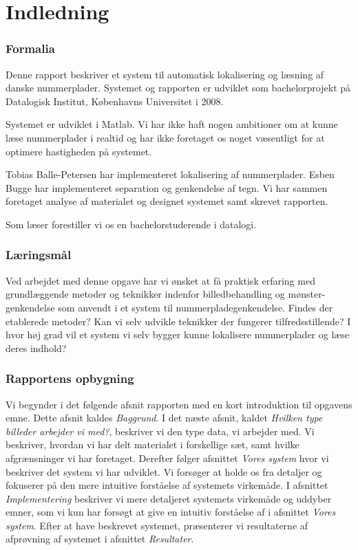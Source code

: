 \section{Indledning}

\subsubsection*{Formalia}
Denne rapport beskriver et system til automatisk lokalisering og læsning af danske nummerplader. Systemet og rapporten er udviklet som bachelorprojekt på Datalogisk Institut, Københavns Universitet i 2008.

Systemet er udviklet i Matlab. Vi har ikke haft nogen ambitioner om at kunne læse nummerplader i realtid og har ikke foretaget os noget væsentligt for at optimere hastigheden på systemet.

Tobias Balle-Petersen har implementeret lokalisering af nummerplader. Esben Bugge har implementeret separation og genkendelse af tegn. Vi har sammen foretaget analyse af materialet og designet systemet samt skrevet rapporten.

Som læser forestiller vi os en bachelorstuderende i datalogi.

\subsubsection*{Læringsmål}
Ved arbejdet med denne opgave har vi ønsket at få praktisk erfaring med grundlæggende metoder og teknikker indenfor billedbehandling og mønster-genkendelse som anvendt i et system til nummerpladegenkendelse. Findes der etablerede metoder? Kan vi selv udvikle teknikker der fungerer tilfredsstillende? I hvor høj grad vil et system vi selv bygger kunne lokalisere nummerplader og læse deres indhold?

\subsubsection*{Rapportens opbygning}
Vi begynder i det følgende afsnit rapporten med en kort introduktion til opgavens emne. Dette afsnit kaldes \textit{Baggrund}. I det næste afsnit, kaldet \textit{Hvilken type billeder arbejder vi med?}, beskriver vi den type data, vi arbejder med. Vi beskriver, hvordan vi har delt materialet i forskellige sæt, samt hvilke afgrænsninger vi har foretaget. Derefter følger afsnittet \textit{Vores system} hvor vi beskriver det system vi har udviklet. Vi forsøger at holde os fra detaljer og fokuserer på den mere intuitive forståelse af systemets virkemåde. I afsnittet \textit{Implementering} beskriver vi mere detaljeret systemets virkemåde og uddyber emner, som vi kun har forsøgt at give en intuitiv forståelse af i afsnittet \textit{Vores system}. Efter at have beskrevet systemet, præsenterer vi resultaterne af afprøvning af systemet i afsnittet \textit{Resultater}.

